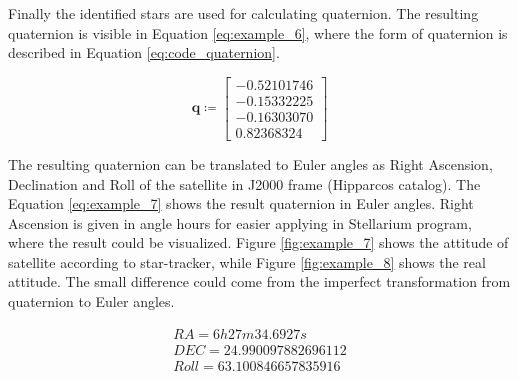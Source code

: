 \documentclass[12pt,a4paper,twoside]{article}
\begin{document}
Finally the identified stars are used for calculating quaternion. The resulting quaternion is visible in Equation \ref{eq:example_6}, where the form of quaternion is described in Equation \ref{eq:code_quaternion}.

\begin{equation} \label{eq:example_6}
\bm{q} \coloneqq \begin{bmatrix}
-0.52101746 \\
-0.15332225 \\
-0.16303070 \\
 0.82368324
\end{bmatrix}
\end{equation}

The resulting quaternion can be translated to Euler angles as Right Ascension, Declination and Roll of the satellite in J2000 frame (Hipparcos catalog). The Equation \ref{eq:example_7} shows the result quaternion in Euler angles. Right Ascension is given in angle hours for easier applying in Stellarium program, where the result could be visualized. Figure \ref{fig:example_7} shows the attitude of satellite according to star-tracker, while Figure \ref{fig:example_8} shows the real attitude. The small difference could come from the imperfect transformation from quaternion to Euler angles.

\begin{equation} \label{eq:example_7}
\begin{split}
RA = 6h27m34.6927s \\
DEC = 24.990097882696112 \\
Roll = 63.100846657835916 \\
\end{split}
\end{equation}
\end{document}
